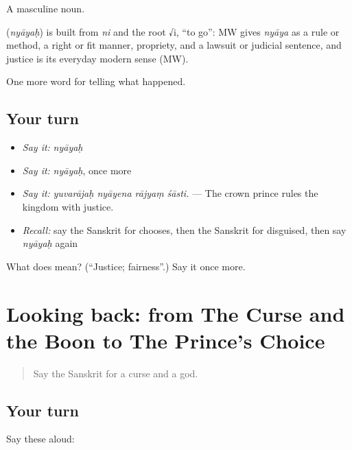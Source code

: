 A masculine noun.

\begin{cousinweb}
\textbf{} (\emph{nyāyaḥ}) is built from \emph{ni} and the root √i, \textquotedblleft{}to go\textquotedblright{}: MW gives \emph{nyāya} as a rule or method, a right or fit manner, propriety, and a lawsuit or judicial sentence, and justice is its everyday modern sense (MW).
\end{cousinweb}

\begin{grammarlens}[title={What you've built}]
One more word for telling what happened.
\end{grammarlens}

\subsection*{Your turn}
\begin{itemize}
\raggedright
  \item \emph{Say it:} \emph{nyāyaḥ}
  \item \emph{Say it:} \emph{nyāyaḥ}, once more
  \item \emph{Say it:} \emph{yuvarājaḥ nyāyena rājyaṃ śāsti.} — The crown prince rules the kingdom with justice.
  \item \emph{Recall:} say the Sanskrit for chooses, then the Sanskrit for disguised, then say \emph{nyāyaḥ} again
\end{itemize}

\begin{tcolorbox}[breakable,colback=teal!4,colframe=teal!35!black,title={Before you move on}]
What does  mean? (\textquotedblleft{}Justice; fairness\textquotedblright{}.) Say it once more.
\end{tcolorbox}
\section[(dialogue)]{Looking back: from The Curse and the Boon to The Prince's Choice}

\label{lesson:SA-R339-review-333-339}



\begin{quote}
Say the Sanskrit for a curse and a god.
\end{quote}

\subsection*{Your turn}
Say these aloud:

